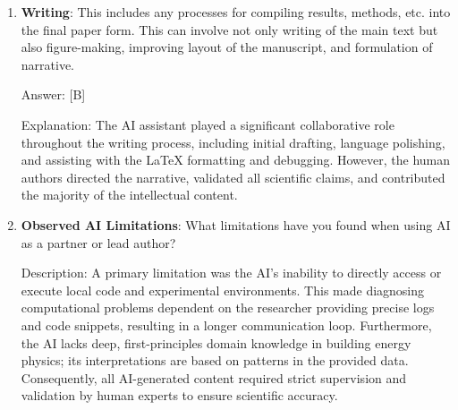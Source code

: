 ﻿\documentclass{article}
\begin{document}
\begin{enumerate}
    Answer: [B]
    
    Explanation: The AI assistant was used in a supportive capacity to help organize and summarize results. It also offered linguistic and structural suggestions on how to articulate the significance of the findings (e.g., the core narrative of 'from model failure to preliminary viability'). The actual data analysis and the final scientific interpretation were led and performed by the human researchers.

    \item \textbf{Writing}: This includes any processes for compiling results, methods, etc. into the final paper form. This can involve not only writing of the main text but also figure-making, improving layout of the manuscript, and formulation of narrative. 

    Answer: [B]
    
    Explanation: The AI assistant played a significant collaborative role throughout the writing process, including initial drafting, language polishing, and assisting with the LaTeX formatting and debugging. However, the human authors directed the narrative, validated all scientific claims, and contributed the majority of the intellectual content.

    \item \textbf{Observed AI Limitations}: What limitations have you found when using AI as a partner or lead author? 
    
    Description: A primary limitation was the AI's inability to directly access or execute local code and experimental environments. This made diagnosing computational problems dependent on the researcher providing precise logs and code snippets, resulting in a longer communication loop. Furthermore, the AI lacks deep, first-principles domain knowledge in building energy physics; its interpretations are based on patterns in the provided data. Consequently, all AI-generated content required strict supervision and validation by human experts to ensure scientific accuracy.
\end{enumerate}
\end{document}
